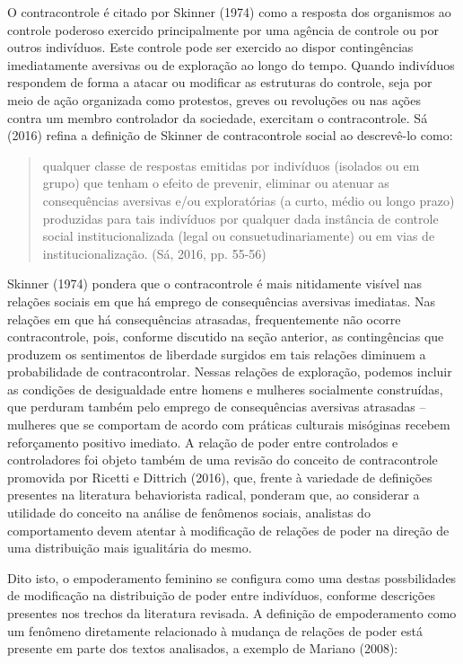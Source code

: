 O contracontrole é citado por Skinner (1974) como a resposta dos organismos ao controle poderoso exercido principalmente por uma agência de controle ou por outros indivíduos. Este controle pode ser exercido ao dispor contingências imediatamente aversivas ou de exploração ao longo do tempo. Quando indivíduos respondem de forma a atacar ou modificar as estruturas do controle, seja por meio de ação organizada como protestos, greves ou revoluções ou nas ações contra um membro controlador da sociedade, exercitam o contracontrole. Sá (2016) refina a definição de Skinner de contracontrole social ao descrevê-lo como:

\begin{quote}
    qualquer classe de respostas emitidas por indivíduos (isolados ou em grupo) que tenham o efeito de prevenir, eliminar ou atenuar as consequências aversivas e/ou exploratórias (a curto, médio ou longo prazo) produzidas para tais indivíduos por qualquer dada instância de controle social institucionalizada (legal ou consuetudinariamente) ou em vias de institucionalização. (Sá, 2016, pp. 55-56)
\end{quote}

Skinner (1974) pondera que o contracontrole é mais nitidamente visível nas relações sociais em que há emprego de consequências aversivas imediatas. Nas relações em que há consequências atrasadas, frequentemente não ocorre contracontrole, pois, conforme discutido na seção anterior, as contingências que produzem os sentimentos de liberdade surgidos em tais relações diminuem a probabilidade de contracontrolar. Nessas relações de exploração, podemos incluir as condições de desigualdade entre homens e mulheres socialmente construídas, que perduram também pelo emprego de consequências aversivas atrasadas – mulheres que se comportam de acordo com práticas culturais misóginas recebem reforçamento positivo imediato. A relação de poder entre controlados e controladores foi objeto também de uma revisão do conceito de contracontrole promovida por Ricetti e Dittrich (2016), que, frente à variedade de definições presentes na literatura behaviorista radical, ponderam que, ao considerar a utilidade do conceito na análise de fenômenos sociais, analistas do comportamento devem atentar à modificação de relações de poder na direção de uma distribuição mais igualitária do mesmo.

Dito isto, o empoderamento feminino se configura como uma destas possbilidades de modificação na distribuição de poder entre indivíduos, conforme descrições presentes nos trechos da literatura revisada. A definição de empoderamento como um fenômeno diretamente relacionado à mudança de relações de poder está presente em parte dos textos analisados, a exemplo de Mariano (2008):

